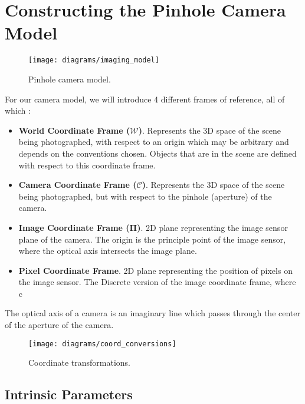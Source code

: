 \section{Constructing the Pinhole Camera Model}

\begin{figure}[H]
    \centering
    \texttt{[image: diagrams/imaging\_model]}
    \caption{Pinhole camera model.}
\end{figure}

For our camera model, we will introduce 4 different frames of reference, all of which :
\begin{itemize}[leftmargin=!, itemindent=-4ex]
    \item\textbf{World Coordinate Frame ($\boldsymbol{\mathcal{W}}$)}. Represents the 3D space of the scene being photographed, with respect to an origin which may be arbitrary and depends on the conventions chosen. Objects that are in the scene are defined with respect to this coordinate frame.
    \item\textbf{Camera Coordinate Frame ($\boldsymbol{\mathcal{C}}$)}. Represents the 3D space of the scene being photographed, but with respect to the pinhole (aperture) of the camera.
    \item\textbf{Image Coordinate Frame ($\boldsymbol{\Pi}$)}. 2D plane representing the image sensor plane of the camera. The origin is the principle point of the image sensor, where the optical axis intersects the image plane.
    \item\textbf{Pixel Coordinate Frame}. 2D plane representing the position of pixels on the image sensor. The Discrete version of the image coordinate frame, where c
\end{itemize}

The optical axis of a camera is an imaginary line which passes through the center of the aperture of the camera.





\begin{figure}[H]
    \centering
    \texttt{[image: diagrams/coord\_conversions]}
    \caption{Coordinate transformations.}
\end{figure}


\subsection{Intrinsic Parameters} \label{sec:intrinsics}

